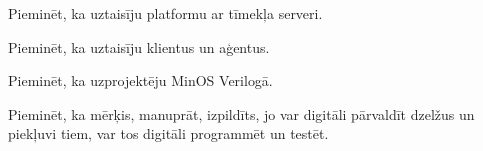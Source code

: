 Pieminēt, ka uztaisīju platformu ar tīmekļa serveri.

Pieminēt, ka uztaisīju klientus un aģentus.

Pieminēt, ka uzprojektēju MinOS Verilogā.

Pieminēt, ka mērķis, manuprāt, izpildīts, jo var digitāli pārvaldīt dzelžus un piekļuvi tiem, var tos digitāli programmēt un testēt.   
